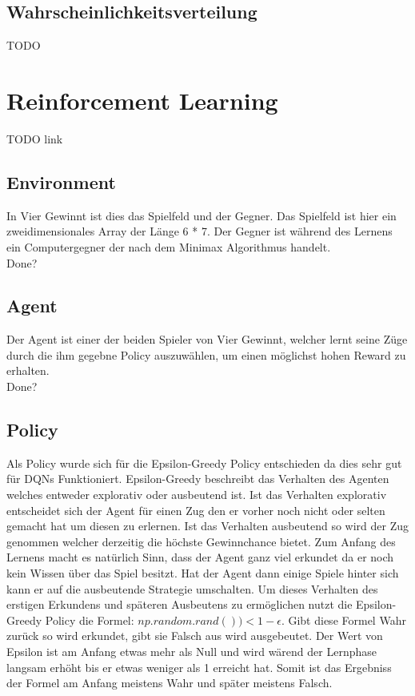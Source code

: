 \subsection{Wahrscheinlichkeitsverteilung}
\colorbox{red!30}{TODO}

\section{Reinforcement Learning}

\colorbox{red!30}{TODO link}

\subsection{Environment}
In Vier Gewinnt ist dies das Spielfeld und der Gegner. Das Spielfeld ist hier ein zweidimensionales Array der Länge 6 * 7. Der Gegner ist während des Lernens ein Computergegner der nach dem Minimax Algorithmus handelt. \\
\colorbox{red!30}{Done?}

\subsection{Agent}
Der Agent ist einer der beiden Spieler von Vier Gewinnt, welcher lernt seine Züge durch die ihm gegebne Policy auszuwählen, um einen möglichst hohen Reward zu erhalten.\\
\colorbox{red!30}{Done?} 

\subsection{Policy}
Als Policy wurde sich für die Epsilon-Greedy Policy entschieden da dies sehr gut für DQNs Funktioniert. Epsilon-Greedy beschreibt das Verhalten des Agenten welches entweder explorativ oder ausbeutend ist. Ist das Verhalten explorativ entscheidet sich der Agent für einen Zug den er vorher noch nicht oder selten gemacht hat um diesen zu erlernen. Ist das Verhalten ausbeutend so wird der Zug genommen welcher derzeitig die höchste Gewinnchance bietet. Zum Anfang des Lernens macht es natürlich Sinn, dass der Agent ganz viel erkundet da er noch kein Wissen über das Spiel besitzt. Hat der Agent dann einige Spiele hinter sich kann er auf die ausbeutende Strategie umschalten. Um dieses Verhalten des erstigen Erkundens und späteren Ausbeutens zu ermöglichen nutzt die Epsilon-Greedy Policy die Formel: $np.random.rand())<1-\epsilon$. Gibt diese Formel Wahr zurück so wird erkundet, gibt sie Falsch aus wird ausgebeutet. Der Wert von Epsilon ist am Anfang etwas mehr als Null und wird wärend der Lernphase langsam erhöht bis er etwas weniger als 1 erreicht hat. Somit ist das Ergebniss der Formel am Anfang meistens Wahr und später meistens Falsch.

